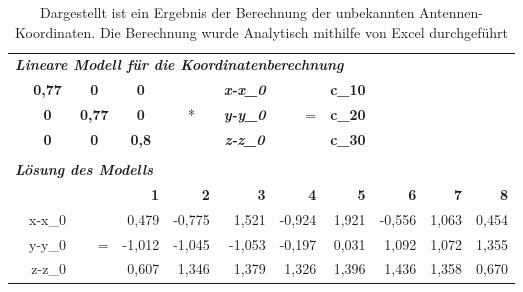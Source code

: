 \begin{table}[h]
  \caption{Dargestellt ist ein Ergebnis der Berechnung der unbekannten Antennen-Koordinaten. Die Berechnung wurde Analytisch mithilfe von Excel durchgeführt}
  \vspace{0.5cm}
    \begin{tabular}{r|rrr|r|r|r|r|rrr}
    \multicolumn{11}{l}{\textit{\textbf{Lineare Modell für die Koordinatenberechnung}}} \\
          & \multicolumn{1}{c}{\textbf{0,77}} & \multicolumn{1}{c}{\textbf{0}} & \multicolumn{1}{c|}{\textbf{0}} &       & \multicolumn{1}{c|}{\textit{\textbf{x-x\_0}}} &       & \multicolumn{1}{c|}{\textbf{c\_10}} &       &       &  \\
          & \multicolumn{1}{c}{\textbf{0}} & \multicolumn{1}{c}{\textbf{0,77}} & \multicolumn{1}{c|}{\textbf{0}} & \multicolumn{1}{c|}{*} & \multicolumn{1}{c|}{\textit{\textbf{y-y\_0}}} & =     & \multicolumn{1}{c|}{\textbf{c\_20}} &       &       &  \\
          & \multicolumn{1}{c}{\textbf{0}} & \multicolumn{1}{c}{\textbf{0}} & \multicolumn{1}{c|}{\textbf{0,8}} &       & \multicolumn{1}{c|}{\textit{\textbf{z-z\_0}}} &       & \multicolumn{1}{c|}{\textbf{c\_30}} &       &       &  \\
    \multicolumn{1}{r}{} &       &       & \multicolumn{1}{r}{} & \multicolumn{1}{r}{} & \multicolumn{1}{r}{} & \multicolumn{1}{r}{} & \multicolumn{1}{r}{} &       &       &  \\
    \multicolumn{11}{l}{\textit{\textbf{Lösung des Modells}}} \\
    \multicolumn{1}{r}{} &       &       & \multicolumn{1}{r}{\textbf{1}} & \multicolumn{1}{r}{\textbf{2}} & \multicolumn{1}{r}{\textbf{3}} & \multicolumn{1}{r}{\textbf{4}} & \multicolumn{1}{r}{\textbf{5}} & \textbf{6} & \textbf{7} & \textbf{8}\\
\cline{2-11}    \multicolumn{1}{r}{} & x-x\_0 &       & \multicolumn{1}{r}{0,479} & \multicolumn{1}{r}{-0,775} & \multicolumn{1}{r}{1,521} & \multicolumn{1}{r}{-0,924} & \multicolumn{1}{r}{1,921} & -0,556 & 1,063 & 0,454 \\
    \multicolumn{1}{r}{} & y-y\_0 & =     & \multicolumn{1}{r}{-1,012} & \multicolumn{1}{r}{-1,045} & \multicolumn{1}{r}{-1,053} & \multicolumn{1}{r}{-0,197} & \multicolumn{1}{r}{0,031} & 1,092 & 1,072 & 1,355 \\
    \multicolumn{1}{r}{} & z-z\_0 &       & \multicolumn{1}{r}{0,607} & \multicolumn{1}{r}{1,346} & \multicolumn{1}{r}{1,379} & \multicolumn{1}{r}{1,326} & \multicolumn{1}{r}{1,396} & 1,436 & 1,358 & 0,670 \\

\end{tabular}
\end{table}
